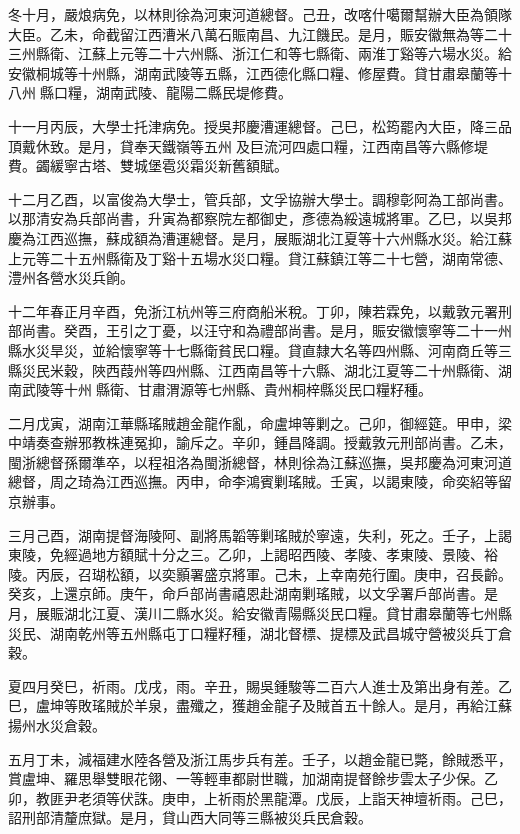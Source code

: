 \begin{pinyinscope}
冬十月，嚴烺病免，以林則徐為河東河道總督。己丑，改喀什噶爾幫辦大臣為領隊大臣。乙未，命截留江西漕米八萬石賑南昌、九江饑民。是月，賑安徽無為等二十三州縣衛、江蘇上元等二十六州縣、浙江仁和等七縣衛、兩淮丁谿等六場水災。給安徽桐城等十州縣，湖南武陵等五縣，江西德化縣口糧、修屋費。貸甘肅皋蘭等十八州縣口糧，湖南武陵、龍陽二縣民堤修費。

十一月丙辰，大學士托津病免。授吳邦慶漕運總督。己巳，松筠罷內大臣，降三品頂戴休致。是月，貸奉天鐵嶺等五州及巨流河四處口糧，江西南昌等六縣修堤費。蠲緩寧古塔、雙城堡雹災霜災新舊額賦。

十二月乙酉，以富俊為大學士，管兵部，文孚協辦大學士。調穆彰阿為工部尚書。以那清安為兵部尚書，升寅為都察院左都御史，彥德為綏遠城將軍。乙巳，以吳邦慶為江西巡撫，蘇成額為漕運總督。是月，展賑湖北江夏等十六州縣水災。給江蘇上元等二十五州縣衛及丁谿十五場水災口糧。貸江蘇鎮江等二十七營，湖南常德、澧州各營水災兵餉。

十二年春正月辛酉，免浙江杭州等三府商船米稅。丁卯，陳若霖免，以戴敦元署刑部尚書。癸酉，王引之丁憂，以汪守和為禮部尚書。是月，賑安徽懷寧等二十一州縣水災旱災，並給懷寧等十七縣衛貧民口糧。貸直隸大名等四州縣、河南商丘等三縣災民米穀，陜西葭州等四州縣、江西南昌等十六縣、湖北江夏等二十州縣衛、湖南武陵等十州縣衛、甘肅渭源等七州縣、貴州桐梓縣災民口糧籽種。

二月戊寅，湖南江華縣瑤賊趙金龍作亂，命盧坤等剿之。己卯，御經筵。甲申，梁中靖奏查辦邪教株連冤抑，諭斥之。辛卯，鍾昌降調。授戴敦元刑部尚書。乙未，閩浙總督孫爾準卒，以程祖洛為閩浙總督，林則徐為江蘇巡撫，吳邦慶為河東河道總督，周之琦為江西巡撫。丙申，命李鴻賓剿瑤賊。壬寅，以謁東陵，命奕紹等留京辦事。

三月己酉，湖南提督海陵阿、副將馬韜等剿瑤賊於寧遠，失利，死之。壬子，上謁東陵，免經過地方額賦十分之三。乙卯，上謁昭西陵、孝陵、孝東陵、景陵、裕陵。丙辰，召瑚松額，以奕顥署盛京將軍。己未，上幸南苑行圍。庚申，召長齡。癸亥，上還京師。庚午，命戶部尚書禧恩赴湖南剿瑤賊，以文孚署戶部尚書。是月，展賑湖北江夏、漢川二縣水災。給安徽青陽縣災民口糧。貸甘肅皋蘭等七州縣災民、湖南乾州等五州縣屯丁口糧籽種，湖北督標、提標及武昌城守營被災兵丁倉穀。

夏四月癸巳，祈雨。戊戌，雨。辛丑，賜吳鍾駿等二百六人進士及第出身有差。乙巳，盧坤等敗瑤賊於羊泉，盡殲之，獲趙金龍子及賊首五十餘人。是月，再給江蘇揚州水災倉穀。

五月丁未，減福建水陸各營及浙江馬步兵有差。壬子，以趙金龍已斃，餘賊悉平，賞盧坤、羅思舉雙眼花翎、一等輕車都尉世職，加湖南提督餘步雲太子少保。乙卯，教匪尹老須等伏誅。庚申，上祈雨於黑龍潭。戊辰，上詣天神壇祈雨。己巳，詔刑部清釐庶獄。是月，貸山西大同等三縣被災兵民倉穀。


\end{pinyinscope}

